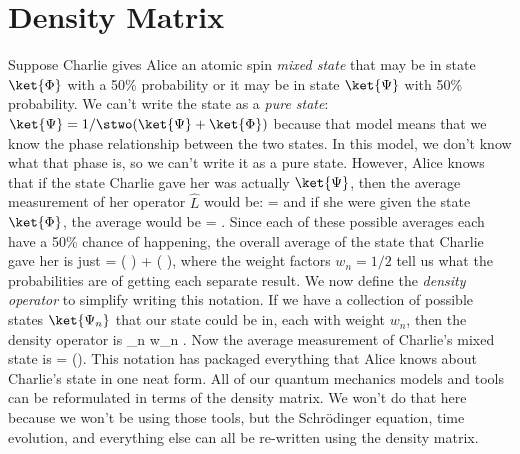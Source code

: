 \section{Density Matrix}
Suppose Charlie gives Alice an atomic spin {\em mixed state} that may be in state $\ket{\Phi}$ with a 50\% probability or it may be in state $\ket{\Psi}$ with 50\% probability. We can't write the state as a {\em pure state}: $\ket{\Psi}=1/\stwo(\ket{\Psi} + \ket{\Phi})$ because that model means that we know the phase relationship between the two states. In this model, we don't know what that phase is, so we can't write it as a pure state. However, Alice knows that if the state Charlie gave her was actually $\ket{\Psi}$, then the average measurement of her operator $\hat{L}$ would be:
\beq
{} = \Tr \oprod{\Psi}{\Psi}
\eeq
and if she were given the state $\ket{\Phi}$, the average would be
\beq
{} = \Tr \oprod{\Phi}{\Phi}.
\eeq
Since each of these possible averages each have a 50\% chance of happening, the overall average of the state that Charlie gave her is just
\beq
{} = \left(\Tr \oprod{\Psi}{\Psi} \right) + \left(\Tr \oprod{\Phi}{\Phi} \right),
\eeq
{}where the weight factors $w_n = 1/2$ tell us what the probabilities are of getting each separate result. We now define the {\em density operator} to simplify writing this notation. If we have a collection of possible states $\ket{\Psi_n}$ that our state could be in, each with weight $w_n$, then the density operator is
\beq
\hat{\rho} \equiv \sum_n w_n .
\label{eq:densitymat}
\eeq
{} Now the average measurement of Charlie's mixed state is
\beq
{} = \Tr(\hat{\rho}).
\label{eq:densitmatrixavg}
\eeq
This notation has packaged everything that Alice knows about Charlie's state in one neat form. All of our quantum mechanics models and tools can be reformulated in terms of the density matrix. We won't do that here because we won't be using those tools, but the Schr\"{o}dinger equation, time evolution, and everything else can all be re-written using the density matrix.




